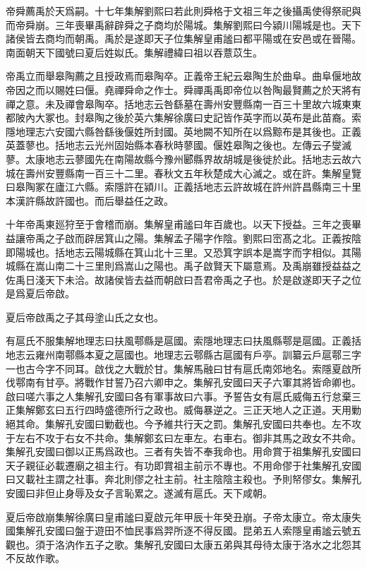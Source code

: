 帝舜薦禹於天爲嗣。十七年集解劉熙曰若此則舜格于文祖三年之後攝禹使得祭祀與而帝舜崩。三年喪畢禹辭辟舜之子商均於陽城。集解劉熙曰今潁川陽城是也。天下諸侯皆去商均而朝禹。禹於是遂即天子位集解皇甫謐曰都平陽或在安邑或在晉陽。南面朝天下國號曰夏后姓姒氏。集解禮緯曰祖以吞薏苡生。

帝禹立而舉皋陶薦之且授政焉而皋陶卒。正義帝王紀云皋陶生於曲阜。曲阜偃地故帝因之而以賜姓曰偃。堯禪舜命之作士。舜禪禹禹即帝位以咎陶最賢薦之於天將有禪之意。未及禪會皋陶卒。括地志云咎繇墓在壽州安豐縣南一百三十里故六城東東都陂內大冢也。封皋陶之後於英六集解徐廣曰史記皆作英字而以英布是此苗裔。索隱地理志六安國六縣咎繇後偃姓所封國。英地闕不知所在以爲黥布是其後也。正義英蓋蓼也。括地志云光州固始縣本春秋時蓼國。偃姓皋陶之後也。左傳云子燮滅蓼。太康地志云蓼國先在南陽故縣今豫州郾縣界故胡城是後徙於此。括地志云故六城在壽州安豐縣南一百三十二里。春秋文五年秋楚成大心滅之。或在許。集解皇覽曰皋陶冢在廬江六縣。索隱許在潁川。正義括地志云許故城在許州許昌縣南三十里本漢許縣故許國也。而后舉益任之政。

十年帝禹東廵狩至于會稽而崩。集解皇甫謐曰年百歲也。以天下授益。三年之喪畢益讓帝禹之子啟而辟居箕山之陽。集解孟子陽字作陰。劉熙曰崈髙之北。正義按陰即陽城也。括地志云陽城縣在箕山北十三里。又恐箕字誤本是嵩字而字相似。其陽城縣在嵩山南二十三里則爲嵩山之陽也。禹子啟賢天下屬意焉。及禹崩雖授益益之佐禹日淺天下未洽。故諸侯皆去益而朝啟曰吾君帝禹之子也。於是啟遂即天子之位是爲夏后帝啟。

夏后帝啟禹之子其母塗山氏之女也。

有扈氏不服集解地理志曰扶風鄠縣是扈國。索隱地理志曰扶風縣鄠是扈國。正義括地志云雍州南鄠縣本夏之扈國也。地理志云鄠縣古扈國有戶亭。訓纂云戶扈鄠三字一也古今字不同耳。啟伐之大戰於甘。集解馬融曰甘有扈氏南郊地名。索隱夏啟所伐鄠南有甘亭。將戰作甘誓乃召六卿申之。集解孔安國曰天子六軍其將皆命卿也。啟曰嗟六事之人集解孔安國曰各有軍事故曰六事。予誓告女有扈氏威侮五行怠棄三正集解鄭玄曰五行四時盛德所行之政也。威侮暴逆之。三正天地人之正道。天用勦絕其命。集解孔安國曰勦截也。今予維共行天之罰。集解孔安國曰共奉也。左不攻于左右不攻于右女不共命。集解鄭玄曰左車左。右車右。御非其馬之政女不共命。集解孔安國曰御以正馬爲政也。三者有失皆不奉我命也。用命賞于祖集解孔安國曰天子親征必載遷廟之祖主行。有功即賞祖主前示不專也。不用命僇于社集解孔安國曰又載社主謂之社事。奔北則僇之社主前。社主陰陰主殺也。予則帑僇女。集解孔安國曰非但止身辱及女子言恥累之。遂滅有扈氏。天下咸朝。

夏后帝啟崩集解徐廣曰皇甫謐曰夏啟元年甲辰十年癸丑崩。子帝太康立。帝太康失國集解孔安國曰盤于遊田不恤民事爲羿所逐不得反國。昆弟五人索隱皇甫謐云號五觀也。須于洛汭作五子之歌。集解孔安國曰太康五弟與其母待太康于洛水之北怨其不反故作歌。

